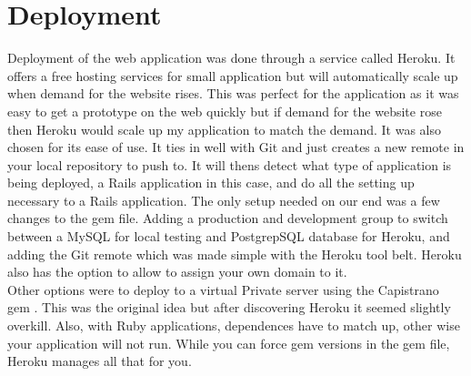 \section{Deployment}
\label{sec:deployment}
Deployment of the web application was done through a service called Heroku. It offers a free hosting services for small application but will automatically scale up when demand for the website rises. This was perfect for the application as it was easy to get a prototype on the web quickly but if demand for the website rose then Heroku would scale up my application to match the demand. It was also chosen for its ease of use. It ties in well with Git and just creates a new remote in your local repository to push to. It will thens detect what type of application is being deployed, a Rails application in this case, and do all the setting up necessary to a Rails application. The only setup needed on our end was a few changes to the gem file. Adding a production and development group to switch between a MySQL \citep{mysql:1995} for local testing and PostgrepSQL \citep{postgres:1995} database for Heroku, and adding the Git remote which was made simple with the Heroku tool belt. Heroku also has the option to allow to assign your own domain to it.\\

Other options were to deploy to a virtual Private server using the Capistrano gem \citep{capistrano:2013}. This was the original idea but after discovering Heroku it seemed slightly overkill. Also, with Ruby applications, dependences have to match up, other wise your application will not run. While you can force gem versions in the gem file, Heroku manages all that for you.
